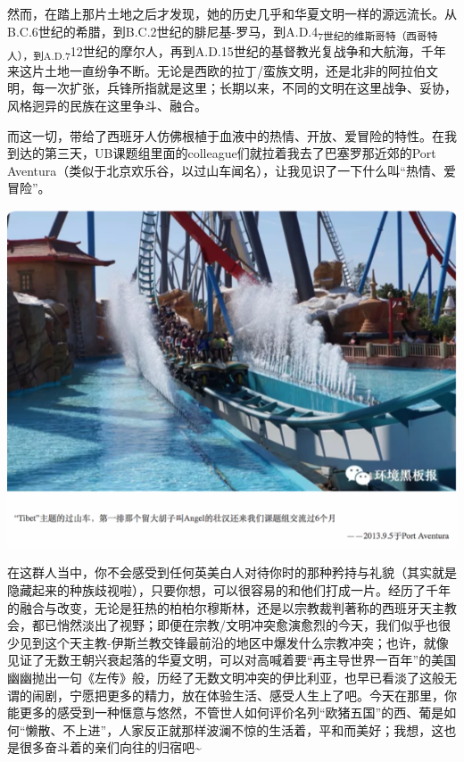 \documentclass[]{book}
\begin{document}
然而，在踏上那片土地之后才发现，她的历史几乎和华夏文明一样的源远流长。从B.C.6世纪的希腊，到B.C.2世纪的腓尼基-罗马，到A.D.4\textsubscript{7世纪的维斯哥特（西哥特人），到A.D.7}12世纪的摩尔人，再到A.D.15世纪的基督教光复战争和大航海，千年来这片土地一直纷争不断。无论是西欧的拉丁/蛮族文明，还是北非的阿拉伯文明，每一次扩张，兵锋所指就是这里；长期以来，不同的文明在这里战争、妥协，风格迥异的民族在这里争斗、融合。

而这一切，带给了西班牙人仿佛根植于血液中的热情、开放、爱冒险的特性。在我到达的第三天，UB课题组里面的colleague们就拉着我去了巴塞罗那近郊的Port Aventura（类似于北京欢乐谷，以过山车闻名），让我见识了一下什么叫``热情、爱冒险''。

\includegraphics[width=8.33in]{images/xt8}

在这群人当中，你不会感受到任何英美白人对待你时的那种矜持与礼貌（其实就是隐藏起来的种族歧视啦），只要你想，可以很容易的和他们打成一片。经历了千年的融合与改变，无论是狂热的柏柏尔穆斯林，还是以宗教裁判著称的西班牙天主教会，都已悄然淡出了视野；即便在宗教/文明冲突愈演愈烈的今天，我们似乎也很少见到这个天主教-伊斯兰教交锋最前沿的地区中爆发什么宗教冲突；也许，就像见证了无数王朝兴衰起落的华夏文明，可以对高喊着要``再主导世界一百年''的美国幽幽抛出一句《左传》般，历经了无数文明冲突的伊比利亚，也早已看淡了这般无谓的闹剧，宁愿把更多的精力，放在体验生活、感受人生上了吧。今天在那里，你能更多的感受到一种惬意与悠然，不管世人如何评价名列``欧猪五国''的西、葡是如何``懒散、不上进''，人家反正就那样波澜不惊的生活着，平和而美好；我想，这也是很多奋斗着的亲们向往的归宿吧\textasciitilde{}
\end{document}
